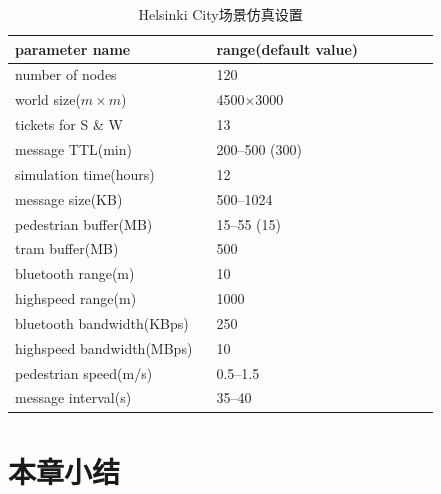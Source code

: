 \begin{table}
\centering
\caption{Helsinki City场景仿真设置}
\label{tab:simulation_helsinki}
\begin{tabular}{
p{0.45\linewidth}<{\centering}
p{0.5\linewidth}<{\centering}
}
\hline
\textbf{parameter name} & \textbf{range(default value)} \\
\hline
number of nodes & 120  \\
world size($m\times m$) & 4500$\times$3000  \\
tickets for S \& W & 13 \\
message TTL(min) & 200--500 (300) \\
simulation time(hours) & 12 \\
message size(KB) & 500--1024 \\
pedestrian buffer(MB) & 15--55 (15) \\
tram buffer(MB) & 500 \\
bluetooth range(m) & 10 \\
highspeed range(m) & 1000 \\ 
bluetooth bandwidth(KBps) & 250 \\
highspeed bandwidth(MBps) & 10 \\ 
pedestrian speed(m/s) & 0.5--1.5  \\
message interval(s) & 35--40 \\
\hline
\end{tabular}
\end{table}

\section{本章小结}
\label{chap5:本章小结}